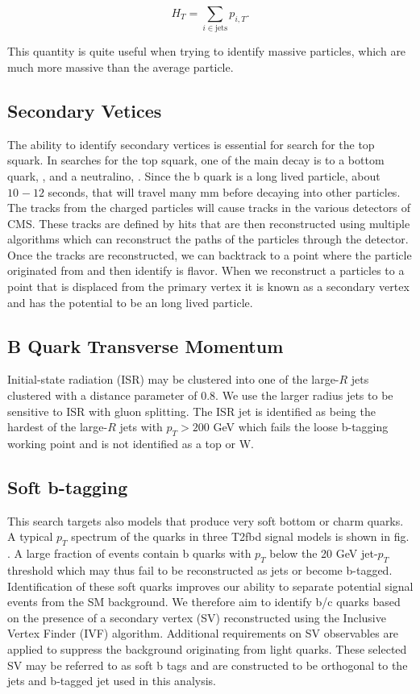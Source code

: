 \begin{equation}
H_T=\sum_{i\in\text{jets}}p_{i,T}.
\end{equation}

This quantity is quite useful when trying to identify massive particles, which are much more massive than the average particle. 

\subsection{Secondary Vetices}\label{SV}

The ability to identify secondary vertices is essential for search for the top squark. In searches for the top squark, one of the main decay is to a bottom quark, \bquark, and a neutralino, \neutralino. Since the b quark is a long lived particle, about $10^{}-12$ seconds, that will travel many mm before decaying into other particles. The tracks from the charged particles will cause tracks in the various detectors of CMS. These tracks are defined by hits that are then reconstructed using multiple algorithms which can reconstruct the paths of the particles through the detector. Once the tracks are reconstructed, we can backtrack to a point where the particle originated from and then identify is flavor. When we reconstruct a particles to a point that is displaced from the primary vertex it is known as a secondary vertex and has the potential to be an long lived particle. 

\subsection{B Quark Transverse Momentum}\label{bTransverseMomentum}

Initial-state radiation (ISR) may be clustered into one of the large-$R$ jets clustered with a distance parameter of $0.8$. We use the larger radius jets to be sensitive to ISR with gluon splitting. The ISR jet is identified as being the hardest of the large-$R$ jets with $p_T>200$ GeV which fails the loose b-tagging working point and is not identified as a top or W. 

\subsection{Soft b-tagging} \label{softB}
This search targets also models that produce very soft bottom or charm quarks. A typical $p_T$ spectrum of the \bquark quarks in three T2fbd signal models is shown in fig. . A large fraction of events contain b quarks with $p_T$ below the 20 GeV jet-$p_T$ threshold which may thus fail to be reconstructed as jets or become b-tagged. Identification of these soft quarks improves our ability to separate potential signal events from the SM background. We therefore aim to identify b/c quarks based on the presence of a secondary vertex (SV) reconstructed using the Inclusive Vertex Finder (IVF) algorithm. Additional requirements on SV observables are applied to suppress the background originating from light quarks. These selected SV may be referred to as soft b tags and are constructed to be orthogonal to the jets and b-tagged jet used in this analysis. 

